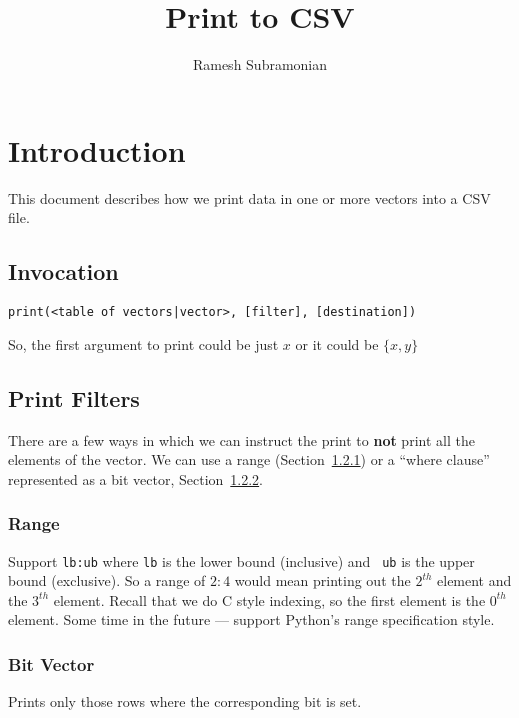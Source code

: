 \documentclass[letterpaper]{article}
\begin{document}
\title{Print to CSV}
\author{ Ramesh Subramonian }
\maketitle
\thispagestyle{fancy}
\cfoot{}
\rfoot{{\small \thepage}}

\section{Introduction}

This document describes how we print data in one or more vectors into a CSV
file. 

\subsection{Invocation}

\begin{verbatim}
print(<table of vectors|vector>, [filter], [destination])
\end{verbatim}
So, the first argument to print could be just \(x\) or 
it could be \(\{x, y\}\)

\subsection{Print Filters}

There are a few ways in which we can instruct the print to {\bf not}
print all the elements of the vector. We can use a range (Section~\ref{range})
or a ``where clause'' represented as a bit vector, Section~\ref{bit_vector}.

\subsubsection{Range}
\label{range}

Support
\verb+lb:ub+ where {\tt lb} is the lower bound (inclusive) and {\tt
ub} is the upper bound (exclusive). So a range of \(2:4\) would mean printing
out the \(2^{th}\) element and the \(3^{th}\) element. 
Recall that we do C style indexing, so the first element is the \(0^{th}\)
element. 
Some time in the future --- support Python's range specification style. 

\subsubsection{Bit Vector}
\label{bit_vector}
Prints only those rows where the corresponding bit is set.
\end{document}
